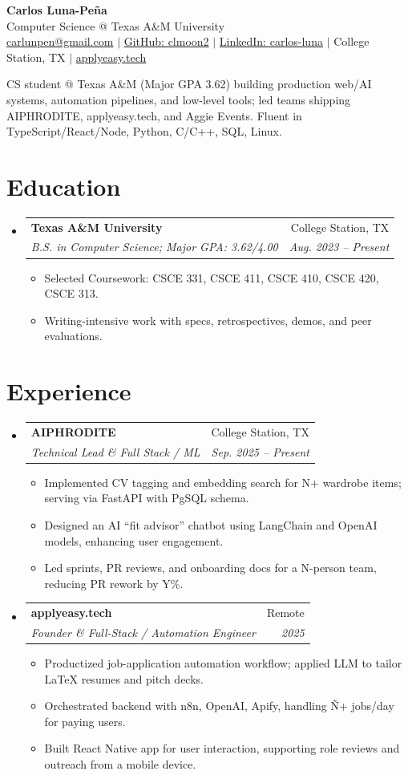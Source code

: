 \documentclass[letterpaper,11pt]{article}
\makeatletter
\newcommand{\resumeItem}[1]{
  \item\small{{#1 \vspace{-2pt}}}
}
\newcommand{\resumeSubheading}[4]{
  \vspace{-2pt}\item
  \begin{tabular*}{0.97\textwidth}[t]{l@{\extracolsep{\fill}}r}
    \textbf{#1} & #2 \\
    \textit{\small#3} & \textit{\small #4} \\
  \end{tabular*}\vspace{-7pt}
}
\newcommand{\resumeSubHeadingListStart}{\begin{itemize}[leftmargin=0.15in, label={}]}
\newcommand{\resumeSubHeadingListEnd}{\end{itemize}}
\newcommand{\resumeItemListStart}{\begin{itemize}}
\newcommand{\resumeItemListEnd}{\end{itemize}\vspace{-5pt}}
\makeatother
\begin{document}
\begin{center}
  \textbf{\Large Carlos Luna-Peña} \\
  Computer Science @ Texas A\&M University \\
  \href{mailto:carlunpen@gmail.com}{carlunpen@gmail.com} $|$ \href{https://github.com/clmoon2}{GitHub: clmoon2} $|$ \href{https://linkedin.com/in/carlos-luna}{LinkedIn: carlos-luna} $|$ College Station, TX $|$ \href{https://applyeasy.tech}{applyeasy.tech}
\end{center}

\vspace{4pt}
CS student @ Texas A\&M (Major GPA 3.62) building production web/AI systems, automation pipelines, and low-level tools; led teams shipping AIPHRODITE, applyeasy.tech, and Aggie Events. Fluent in TypeScript/React/Node, Python, C/C++, SQL, Linux.

\section{Education}
\resumeSubHeadingListStart
\resumeSubheading
{Texas A\&M University}{College Station, TX}
{B.S. in Computer Science; Major GPA: 3.62/4.00}{Aug. 2023 -- Present}
\resumeItemListStart
\resumeItem{Selected Coursework: CSCE 331, CSCE 411, CSCE 410, CSCE 420, CSCE 313.}
\resumeItem{Writing-intensive work with specs, retrospectives, demos, and peer evaluations.}
\resumeItemListEnd
\resumeSubHeadingListEnd

\section{Experience}
\resumeSubHeadingListStart
\resumeSubheading
{AIPHRODITE}{College Station, TX}
{Technical Lead \& Full Stack / ML}{Sep. 2025 -- Present}
\resumeItemListStart
\resumeItem{Implemented CV tagging and embedding search for {N}+ wardrobe items; serving via FastAPI with PgSQL schema.}
\resumeItem{Designed an AI “fit advisor” chatbot using LangChain and OpenAI models, enhancing user engagement.}
\resumeItem{Led sprints, PR reviews, and onboarding docs for a {N}-person team, reducing PR rework by {Y}\%.}
\resumeItemListEnd

\resumeSubheading
{applyeasy.tech}{Remote}
{Founder \& Full-Stack / Automation Engineer}{2025}
\resumeItemListStart
\resumeItem{Productized job-application automation workflow; applied LLM to tailor LaTeX resumes and pitch decks.}
\resumeItem{Orchestrated backend with n8n, OpenAI, Apify, handling \~{N}+ jobs/day for paying users.}
\resumeItem{Built React Native app for user interaction, supporting role reviews and outreach from a mobile device.}
\resumeItemListEnd
\resumeSubHeadingListEnd
\end{document}
